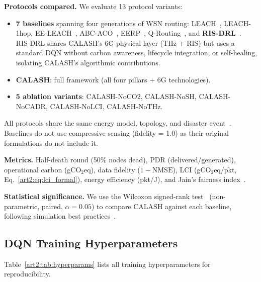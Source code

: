 \textbf{Protocols compared.}
We evaluate 13 protocol variants:
\begin{itemize}
    \item \textbf{7 baselines} spanning four generations of WSN routing: LEACH~\cite{heinzelman2000leach}, LEACH-1hop, EE-LEACH~\cite{bakaraniya2013eeleach}, ABC-ACO~\cite{elkhediri2024abcaco}, EERP~\cite{biswas2018eerp}, Q-Routing~\cite{boyan1994qrouting, watkins1992qlearning}, and \textbf{RIS-DRL}~\cite{huang2020ris_drl, alhilo2024ris_uav, huang2021ris}.
    RIS-DRL shares CALASH's 6G physical layer (THz + RIS) but uses a standard DQN without carbon awareness, lifecycle integration, or self-healing, isolating CALASH's algorithmic contributions.
    \item \textbf{CALASH}: full framework (all four pillars + 6G technologies).
    \item \textbf{5 ablation variants}: CALASH-NoCO2, CALASH-NoSH, CALASH-NoCADR, CALASH-NoLCI, CALASH-NoTHz.
\end{itemize}
All protocols share the same energy model, topology, and disaster event~\cite{dietrich2009lifetime}.
Baselines do not use compressive sensing (fidelity = 1.0) as their original formulations do not include it.

\textbf{Metrics.}
Half-death round (50\% nodes dead), PDR (delivered/generated), operational carbon (gCO$_2$eq), data fidelity ($1{-}\text{NMSE}$), LCI (gCO$_2$eq/pkt, Eq.~\eqref{art2:eq:lci_formal}), energy efficiency (pkt/J), and Jain's fairness index~\cite{jain1984fairness}.

\textbf{Statistical significance.}
We use the Wilcoxon signed-rank test~\cite{wilcoxon1945} (non-parametric, paired, $\alpha = 0.05$) to compare CALASH against each baseline, following simulation best practices~\cite{law2015simulation, jain1991art}.

\subsection{DQN Training Hyperparameters}
\label{art2:sec:hyperparams}

Table~\ref{art2:tab:hyperparams} lists all training hyperparameters for reproducibility.

